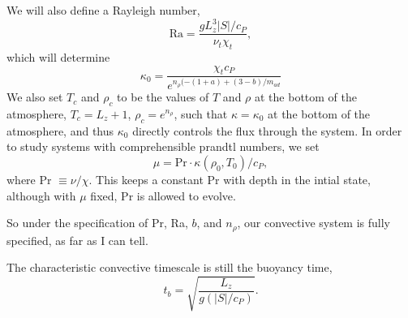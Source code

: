 We will also define a Rayleigh number,
\begin{equation}
\text{Ra} = \frac{g L_z^3 |S|/c_P}{\nu_t \chi_t},
\end{equation}
which will determine
$$
\kappa_0 = \frac{\chi_t c_P}{e^{n_\rho(-(1+a) + (3-b)/m_{ad}}}
$$
We also set $T_c$ and $\rho_c$ to be the values of $T$ and $\rho$ at the
bottom of the atmosphere, $T_c = L_z + 1$, $\rho_c = e^{n_\rho}$, such that
$\kappa = \kappa_0$ at the bottom of the atmosphere, and thus $\kappa_0$ directly
controls the flux through the system. In order to study systems with comprehensible
prandtl numbers, we set
$$
\mu = \text{Pr}\cdot\kappa(\rho_0, T_0)/c_P,
$$
where Pr $\equiv \nu/\chi$. This keeps a constant Pr with depth in the intial state,
although with $\mu$ fixed, Pr is allowed to evolve.

So under the specification of Pr, Ra, $b$, and $n_\rho$, our convective system
is fully specified, as far as I can tell.

The characteristic convective timescale is still the buoyancy time,
$$
t_b = \sqrt{\frac{L_z}{g (|S|/c_P)}}.
$$




